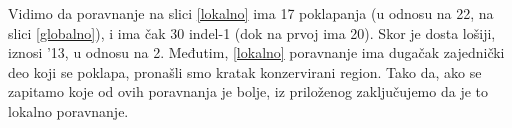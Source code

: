 \noindent Vidimo da poravnanje na slici \ref{lokalno} ima 17 poklapanja (u odnosu na 22, na slici \ref{globalno}), i ima čak 30 indel-1 (dok na prvoj ima 20). Skor je dosta lošiji, iznosi '13, u odnosu na 2. Međutim, \ref{lokalno} poravnanje ima dugačak zajednički deo koji se poklapa, pronašli smo kratak konzervirani region. Tako da, ako se zapitamo koje od ovih poravnanja je bolje, iz priloženog zaključujemo da je to lokalno poravnanje.



